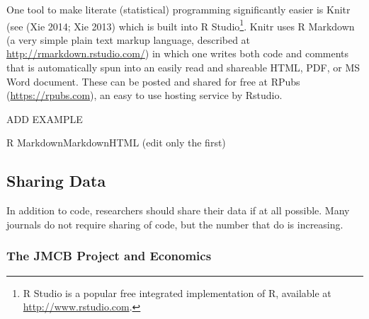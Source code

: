 \documentclass[12pt] {article}
\begin{document}
One tool to make literate (statistical) programming significantly easier
is Knitr (see (Xie 2014; Xie 2013) which is built into R
Studio\footnote{R Studio is a popular free integrated implementation of
  R, available at \href{stylesWithEffects.xml}{http://www.rstudio.com}.}.
Knitr uses R Markdown (a very simple plain text markup language,
described at \url{http://rmarkdown.rstudio.com/}) in which one writes
both code and comments that is automatically spun into an easily read
and shareable HTML, PDF, or MS Word document. These can be posted and
shared for free at RPubs (\url{https://rpubs.com}), an easy to use
hosting service by Rstudio.

ADD EXAMPLE

R MarkdownMarkdownHTML (edit only the first)

\subsection{Sharing Data}\label{sharing-data}

In addition to code, researchers should share their data if at all
possible. Many journals do not require sharing of code, but the number
that do is increasing.

\subsubsection{The JMCB Project and
Economics}\label{the-jmcb-project-and-economics}
\end{document}
